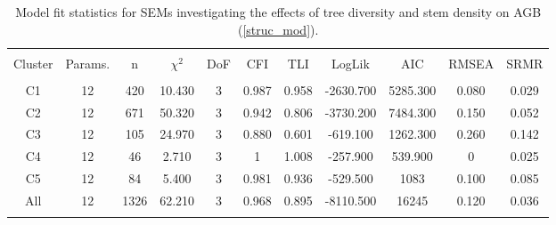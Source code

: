 
\begin{table}[!htbp] \centering 
  \caption{Model fit statistics for SEMs investigating the effects of tree diversity and stem density on AGB (\autoref{struc_mod}).} 
  \label{struc_model_fit_clust_stats} 
\begin{tabular}{@{\extracolsep{0pt}} ccccccccccc} 
\\[-1.8ex]\hline 
\hline \\[-1.8ex] 
{Cluster} & {Params.} & {n} & {$\chi^{2}$} & {DoF} & {CFI} & {TLI} & {LogLik} & {AIC} & {RMSEA} & {SRMR} \\
\hline \\[-1.8ex] 
C1 & 12 & 420 & 10.430 & 3 & 0.987 & 0.958 & -2630.700 & 5285.300 & 0.080 & 0.029 \\ 
C2 & 12 & 671 & 50.320 & 3 & 0.942 & 0.806 & -3730.200 & 7484.300 & 0.150 & 0.052 \\ 
C3 & 12 & 105 & 24.970 & 3 & 0.880 & 0.601 & -619.100 & 1262.300 & 0.260 & 0.142 \\ 
C4 & 12 & 46 & 2.710 & 3 & 1 & 1.008 & -257.900 & 539.900 & 0 & 0.025 \\ 
C5 & 12 & 84 & 5.400 & 3 & 0.981 & 0.936 & -529.500 & 1083 & 0.100 & 0.085 \\ 
All & 12 & 1326 & 62.210 & 3 & 0.968 & 0.895 & -8110.500 & 16245 & 0.120 & 0.036 \\ 
\hline \\[-1.8ex] 
\end{tabular} 
\end{table} 
